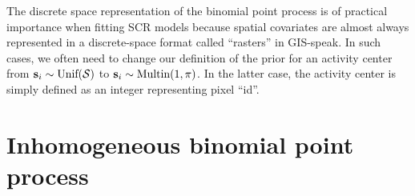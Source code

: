 The discrete space representation of the binomial point process is of
practical importance when fitting SCR models because spatial covariates
are almost always represented in a discrete-space format called
``rasters'' in GIS-speak. In such cases, we often need to change our
definition of the prior for an activity center from ${\bf s}_i \sim
\mbox{Unif}(\cal{S})$ to ${\bf s}_i \sim \mbox{Multin}(1, \mathbf{\pi})$. In the
latter case, the activity center is simply defined as an integer
representing pixel ``id''.



\section{Inhomogeneous binomial point process}

